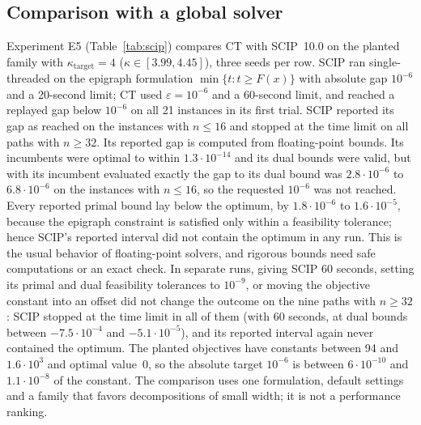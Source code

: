 \subsection{Comparison with a global solver}\label{sec:comp-scip}
Experiment E5 (Table~\ref{tab:scip}) compares CT with SCIP~10.0
\cite{VigerskeGleixner2018,HojnyEtAl2025} on the planted family with
$\kappa_{\mathrm{target}}=4$ ($\kappa\in[3.99,4.45]$), three seeds per row. SCIP
ran single-threaded on the epigraph formulation $\min\{t:t\ge F(x)\}$ with
absolute gap $10^{-6}$ and a 20-second limit; CT used $\varepsilon=10^{-6}$ and a
60-second limit, and reached a replayed gap below $10^{-6}$ on all 21
instances in its first trial. SCIP reported its gap as reached on the
instances with $n\le16$ and stopped at the time limit on all paths with
$n\ge32$. Its reported gap is computed from floating-point bounds. Its
incumbents were optimal to within $1.3\cdot10^{-14}$ and its dual bounds were
valid, but with its incumbent evaluated exactly the gap to its dual bound was
$2.8\cdot10^{-6}$ to $6.8\cdot10^{-6}$ on the instances with $n\le16$, so the
requested $10^{-6}$ was not reached. Every reported primal bound lay below the
optimum, by $1.8\cdot10^{-6}$ to $1.6\cdot10^{-5}$, because the epigraph
constraint is satisfied only within a feasibility tolerance; hence SCIP's
reported interval did not contain the optimum in any run. This is the usual
behavior of floating-point solvers, and rigorous bounds need safe
computations \cite{NeumaierShcherbina2004} or an exact check. In separate
runs, giving SCIP 60 seconds, setting its primal and dual feasibility
tolerances to $10^{-9}$, or moving the objective constant into an offset did
not change the outcome on the nine paths with $n\ge32$: SCIP stopped at the
time limit in all of them (with 60 seconds, at dual bounds between
$-7.5\cdot10^{-4}$ and $-5.1\cdot10^{-5}$), and its reported interval again
never contained the optimum. The planted objectives have constants between
94 and $1.6\cdot10^3$ and optimal value~$0$, so the absolute target $10^{-6}$
is between $6\cdot10^{-10}$ and $1.1\cdot10^{-8}$ of the constant. The comparison uses one
formulation, default settings and a family that favors decompositions of
small width; it is not a performance ranking.

